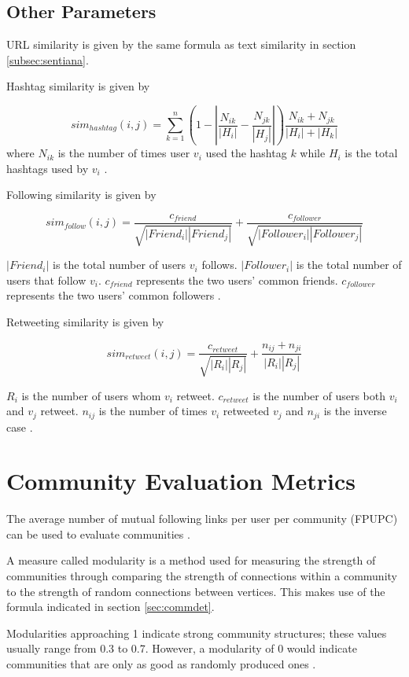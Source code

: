 \subsection{Other Parameters}


URL similarity is given by the same formula as text similarity in section \ref{subsec:sentiana}.


Hashtag similarity is given by 


\begin{equation}
	sim_{hashtag}(i,j) = \sum_{k=1}^n (1 - \left|{\frac{N_{ik}}{\left|{H_i}\right|} - \frac{N_{jk}}{\left|{H_j}\right|}}\right|)\frac{N_{ik} + N_{jk}}{\left|{H_i}\right| + \left|{H_k}\right|}
\end{equation}where $N_{ik}$ is the number of times user $v_i$ used the hashtag $k$ while $H_i$ is the total hashtags used by $v_i$ \cite{Zhang:2012}.


Following similarity is given by 


\begin{equation}
	sim_{follow}(i,j) = \frac{c_{friend}}{\sqrt{\left|{Friend_i}\right|\left|{Friend_j}\right|}} + \frac{c_{follower}}{\sqrt{\left|{Follower_i}\right|\left|{Follower_j}\right|}}
\end{equation}


$\left|{Friend_i}\right|$ is the total number of users $v_i$ follows. $\left|{Follower_i}\right|$ is the total number of users that follow $v_i$. $c_{friend}$ represents the two users’ common friends. $c_{follower}$ represents the two users’ common followers \cite{Zhang:2012}.


Retweeting similarity is given by 


\begin{equation}
	sim_{retweet}(i,j) = \frac{c_{retweet}}{\sqrt{\left|{R_i}\right|\left|{R_j}\right|}} + \frac{n_{ij} + n_{ji}}{\left|{R_i}\right|\left|{R_j}\right|}
\end{equation}


$R_i$ is the number of users whom $v_i$ retweet. $c_{retweet}$ is the number of users both $v_i$ and $v_j$ retweet. $n_{ij}$ is the number of times $v_i$ retweeted $v_j$ and $n_{ji}$ is the inverse case \cite{Zhang:2012}. 


\section{Community Evaluation Metrics}


The average number of mutual following links per user per community (FPUPC) can be used to evaluate communities \cite{Zhang:2012}. 


A measure called modularity is a method used for measuring the strength of communities through comparing the strength of connections within a community to the strength of random connections between vertices.\cite{Newman:2004} This makes use of the formula indicated in section \ref{sec:commdet}.


Modularities approaching 1 indicate strong community structures; these values usually range from 0.3 to 0.7. However, a modularity of 0 would indicate communities that are only as good as randomly produced ones \cite{Newman:2004}. 
